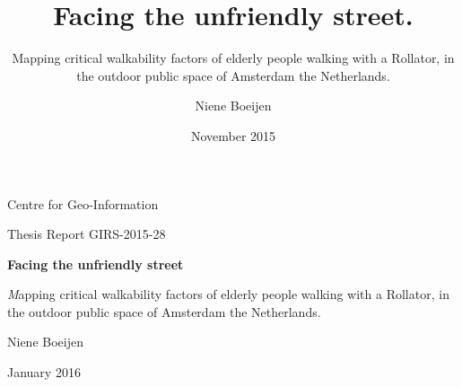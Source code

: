 \documentclass[10pt,a4paper, titlepage, onecolumn, openright, oneside, fleqn]{scrreprt}  %
\begin{document}
 
	

	\title{Facing the unfriendly street.}
	\subtitle{Mapping critical walkability factors of elderly people walking with a Rollator, in the outdoor public space of Amsterdam the Netherlands.}
	\date{November 2015}
	\author{Niene Boeijen}


	\begin{titlepage}
		\vspace*{-3cm}
		\Large Centre for Geo-Information \vspace*{0.5cm}
		
		\Large Thesis Report GIRS-2015-28

		\noindent\makebox[\linewidth]{\rule{\textwidth*2}{0.7pt}}
		\begin{center}
			\vspace*{3cm}
			\Huge \textbf{Facing the unfriendly street}

			\vspace{0.5cm}
			\LARGE\textit Mapping critical walkability factors of elderly people walking with a Rollator, in the outdoor public space of Amsterdam the Netherlands.
						
			\vspace{1.5cm}

			Niene Boeijen

			\vfill
			
			\Large January 2016
		\end{center}
	\end{titlepage}
\end{document}

